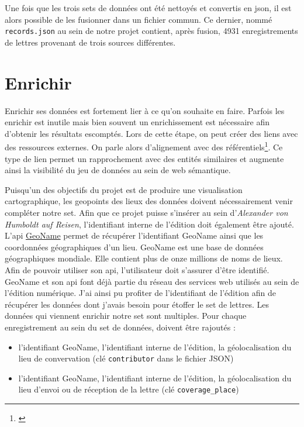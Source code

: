 \documentclass[a4paper, 12pt, twoside]{book}
\begin{document}
Une fois que les trois sets de données ont été nettoyés et convertis en \gls{json}, il est alors possible de les fusionner dans un fichier commun. Ce dernier, nommé \texttt{records.json} au sein de notre projet contient, après fusion, 4931 enregistrements de lettres provenant de trois sources différentes. 

 
\section{Enrichir}
Enrichir ses données est fortement lier à ce qu'on souhaite en faire. Parfois les enrichir est inutile mais bien souvent un enrichissement est nécessaire afin d'obtenir les résultats escomptés. Lors de cette étape, on peut créer des liens avec des ressources externes. On parle alors d'alignement avec des référentiels\footnote{\cite{fabry_publier_2017}}. Ce type de lien permet un rapprochement avec des entités similaires et augmente ainsi la visibilité du jeu de données au sein de web sémantique. 

Puisqu'un des objectifs du projet est de produire une visualisation cartographique, les geopoints des lieux des données doivent nécessairement venir compléter notre set. Afin que ce projet puisse s'insérer au sein d'\textit{Alexander von Humboldt auf Reisen}, l'identifiant interne de l'édition doit également être ajouté. L'\gls{api} \href{https://www.geonames.org/}{GeoName} permet de récupérer l'identifiant GeoName ainsi que les coordonnées géographiques d'un lieu. GeoName est une base de données géographiques mondiale. Elle contient plus de onze millions de noms de lieux. Afin de pouvoir utiliser son \gls{api}, l'utilisateur doit s'assurer d'être identifié. GeoName et son \gls{api} font déjà partie du réseau des services web utilisés au sein de l'édition numérique. J'ai ainsi pu profiter de l'identifiant de l'édition afin de récupérer les données dont j'avais besoin pour étoffer le set de lettres. 
Les données qui viennent enrichir notre set sont multiples. Pour chaque enregistrement au sein du set de données, doivent être rajoutés :
\begin{itemize}
    \item l'identifiant GeoName, l'identifiant interne de l'édition, la géolocalisation du lieu de convervation (clé \texttt{contributor} dans le fichier JSON)
    \item l'identifiant GeoName, l'identifiant interne de l'édition, la géolocalisation du lieu d'envoi ou de réception de la lettre (clé \texttt{coverage\_place})
\end{itemize}
\end{document}

